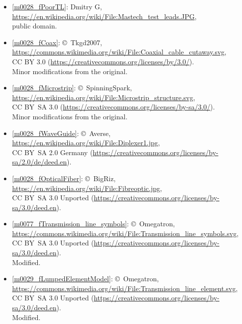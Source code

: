 \begin{itemize}

\item[Fig.] \label{m0028_fPoorTL_Credit}
  \ref{m0028_fPoorTL}:
  Dmitry G, 
  {\footnotesize \url{https://en.wikipedia.org/wiki/File:Mastech_test_leads.JPG}},\\ 
  public domain.

\item[Fig.] \label{m0028_fCoax_Credit}
  \ref{m0028_fCoax}:
  \copyright~Tkgd2007, 
  \url{https://commons.wikimedia.org/wiki/File:Coaxial_cable_cutaway.svg},\\ 
  CC BY 3.0 (\url{https://creativecommons.org/licenses/by/3.0/}).\\
  Minor modifications from the original.

\item[Fig.] \label{m0028_fMicrostrip_Credit}
  \ref{m0028_fMicrostrip}:
  \copyright~SpinningSpark, 
  \url{https://en.wikipedia.org/wiki/File:Microstrip_structure.svg},\\ 
  CC BY~SA 3.0 (\url{https://creativecommons.org/licenses/by-sa/3.0/}).\\
  Minor modifications from the original.

\item[Fig.] \label{m0028_fWaveGuide_Credit}
  \ref{m0028_fWaveGuide}:
  \copyright~Averse, 
  \url{https://en.wikipedia.org/wiki/File:Diplexer1.jpg},\\ 
  CC BY~SA 2.0 Germany (\url{https://creativecommons.org/licenses/by-sa/2.0/de/deed.en}).

\item[Fig.] \label{m0028_fOpticalFiber_Credit}
  \ref{m0028_fOpticalFiber}:
  \copyright~BigRiz, 
  \url{https://en.wikipedia.org/wiki/File:Fibreoptic.jpg},\\ 
  CC BY~SA 3.0 Unported (\url{https://creativecommons.org/licenses/by-sa/3.0/deed.en}).

\item[Fig.] \label{m0077_fTransmission_line_symbols_Credit}
  \ref{m0077_fTransmission_line_symbols}:
  \copyright~Omegatron, 
  \url{https://commons.wikimedia.org/wiki/File:Transmission_line_symbols.svg},\\ 
  CC BY~SA 3.0 Unported (\url{https://creativecommons.org/licenses/by-sa/3.0/deed.en}).\\
  Modified.

\item[Fig.] \label{m0029_fLumpedElementModel_Credit}
  \ref{m0029_fLumpedElementModel}:
  \copyright~Omegatron, 
  \url{https://commons.wikimedia.org/wiki/File:Transmission_line_element.svg},\\ 
  CC BY~SA 3.0 Unported (\url{https://creativecommons.org/licenses/by-sa/3.0/deed.en}).\\
  Modified.


\end{itemize}
